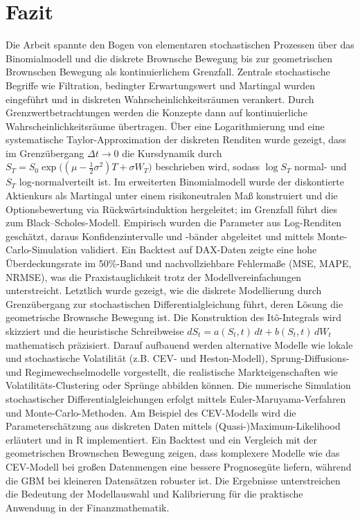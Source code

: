 \newpage

\section{Fazit}

Die Arbeit spannte den Bogen von elementaren stochastischen Prozessen über das Binomialmodell und die diskrete Brownsche 
Bewegung bis zur geometrischen Brownschen Bewegung als kontinuierlichem Grenzfall. Zentrale stochastische Begriffe wie 
Filtration, bedingter Erwartungswert und Martingal wurden eingeführt und in diskreten Wahrscheinlichkeitsräumen verankert. 
Durch Grenzwertbetrachtungen werden die Konzepte dann auf kontinuierliche Wahrscheinlichkeitsräume übertragen. Über eine 
Logarithmierung und eine systematische Taylor-Approximation der diskreten Renditen wurde gezeigt, dass im Grenzübergang 
$\Delta t \to 0$ die Kursdynamik durch
$S_T = S_0 \exp\!\big((\mu - \tfrac12\sigma^2)T + \sigma W_T\big)$
beschrieben wird, sodass $\log S_T$ normal- und $S_T$ log-normalverteilt ist. Im erweiterten Binomialmodell 
wurde der diskontierte Aktienkurs als Martingal unter einem risikoneutralen Maß konstruiert und die Optionsbewertung 
via Rückwärtsinduktion hergeleitet; im Grenzfall führt dies zum Black–Scholes-Modell. Empirisch wurden die Parameter aus 
Log-Renditen geschätzt, daraus Konfidenzintervalle und -bänder abgeleitet und mittels Monte-Carlo-Simulation validiert. 
Ein Backtest auf DAX-Daten zeigte eine hohe Überdeckungsrate im 50\%-Band und nachvollziehbare Fehlermaße (MSE, MAPE, NRMSE), 
was die Praxistauglichkeit trotz der Modellvereinfachungen unterstreicht. Letztlich wurde gezeigt,
wie die diskrete Modellierung durch Grenzübergang zur stochastischen Differentialgleichung führt, deren Lösung die geometrische Brownsche Bewegung ist. Die Konstruktion des Itô-Integrals wird skizziert und die heuristische Schreibweise $dS_t = a(S_t,t)\,dt + b(S_t,t)\,dW_t$ mathematisch präzisiert. 
Darauf aufbauend werden alternative Modelle wie lokale und stochastische Volatilität (z.B. CEV- und Heston-Modell), Sprung-Diffusions- und Regimewechselmodelle vorgestellt, die realistische Markteigenschaften wie Volatilitäts-Clustering oder Sprünge abbilden können. 
Die numerische Simulation stochastischer Differentialgleichungen erfolgt mittels Euler-Maruyama-Verfahren und Monte-Carlo-Methoden. 
Am Beispiel des CEV-Modells wird die Parameterschätzung aus diskreten Daten mittels (Quasi-)Maximum-Likelihood erläutert und in R implementiert. Ein Backtest und ein Vergleich mit der geometrischen Brownschen Bewegung zeigen, dass komplexere Modelle wie das CEV-Modell bei großen Datenmengen eine bessere Prognosegüte liefern, während die GBM bei kleineren Datensätzen robuster ist. Die Ergebnisse unterstreichen die Bedeutung der Modellauswahl und Kalibrierung für die praktische Anwendung in der Finanzmathematik.


